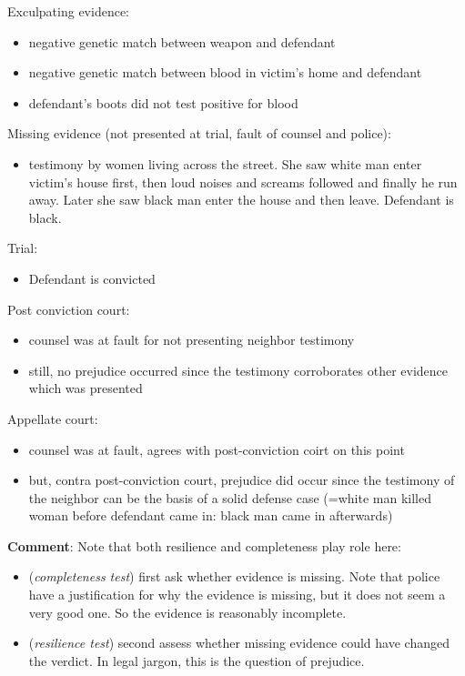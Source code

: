 \documentclass[
  10pt,
  dvipsnames,enabledeprecatedfontcommands]{scrartcl}
\providecommand{\tightlist}{%
  \setlength{\itemsep}{0pt}\setlength{\parskip}{0pt}}
\begin{document}
Exculpating evidence:

\begin{itemize}
\item
  negative genetic match between weapon and defendant
\item
  negative genetic match between blood in victim's home and defendant
\item
  defendant's boots did not test positive for blood
\end{itemize}

Missing evidence (not presented at trial, fault of counsel and police):

\begin{itemize}
\tightlist
\item
  testimony by women living across the street. She saw white man enter
  victim's house first, then loud noises and screams followed and
  finally he run away. Later she saw black man enter the house and then
  leave. Defendant is black.
\end{itemize}

Trial:

\begin{itemize}
\tightlist
\item
  Defendant is convicted
\end{itemize}

Post conviction court:

\begin{itemize}
\item
  counsel was at fault for not presenting neighbor testimony
\item
  still, no prejudice occurred since the testimony corroborates other
  evidence which was presented
\end{itemize}

Appellate court:

\begin{itemize}
\item
  counsel was at fault, agrees with post-conviction coirt on this point
\item
  but, contra post-conviction court, prejudice did occur since the
  testimony of the neighbor can be the basis of a solid defense case
  (=white man killed woman before defendant came in: black man came in
  afterwards)
\end{itemize}

\textbf{Comment}: Note that both resilience and completeness play role
here:

\begin{itemize}
\item
  (\emph{completeness test}) first ask whether evidence is missing. Note
  that police have a justification for why the evidence is missing, but
  it does not seem a very good one. So the evidence is reasonably
  incomplete.
\item
  (\emph{resilience test}) second assess whether missing evidence could
  have changed the verdict. In legal jargon, this is the question of
  prejudice.
\end{itemize}
\end{document}
